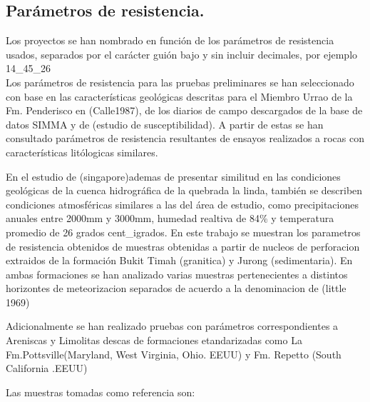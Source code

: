 \subsection{Par\'ametros de resistencia.}
Los proyectos se han nombrado en funci\'{o}n de los par\'{a}metros de resistencia usados,
separados por el car\'{a}cter gui\'{o}n bajo y sin incluir decimales, por ejemplo 14\_45\_26\\

Los par\'ametros de resistencia para las pruebas preliminares se han seleccionado con base en las caracter\'isticas geol\'ogicas descritas para el Miembro Urrao de la Fm. Penderisco en (Calle1987), de los diarios de campo descargados de la base de datos SIMMA y de (estudio de susceptibilidad). \linebreak A partir de estas se han consultado par\'ametros de resistencia resultantes de ensayos realizados a rocas con caracter\'isticas lit\'ologicas similares.

En el estudio de (singapore)ademas de presentar similitud en las condiciones geol\'ogicas de la cuenca hidrogr\'afica de la quebrada la linda, tambi\'en se describen condiciones atmosf\'ericas similares a las del \'area de estudio, como precipitaciones anuales entre 2000mm y 3000mm, humedad realtiva de 84\% y temperatura promedio de 26 grados cent\_igrados.
\linebreak 
En este trabajo se muestran los parametros de resistencia obtenidos de muestras obtenidas a partir de nucleos de perforacion extraidos de la formaci\'on Bukit Timah (granitica) y Jurong (sedimentaria). En ambas formaciones se han analizado varias muestras pertenecientes a distintos horizontes de meteorizacion separados de acuerdo a la denominacion de (little 1969)

Adicionalmente se han realizado pruebas con par\'ametros correspondientes a Areniscas y Limolitas descas de formaciones etandarizadas como La Fm.Pottsville(Maryland, West Virginia, Ohio. EEUU) y Fm. Repetto (South California .EEUU) 

Las muestras tomadas como referencia son: 



